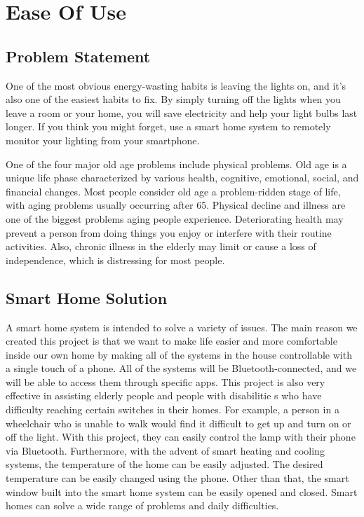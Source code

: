 \section{Ease Of Use}
\subsection{Problem Statement}
One of the most obvious energy-wasting habits is leaving the lights on, and it’s also one of the easiest habits to fix. By simply turning off the lights when you leave a room or your home, you will save electricity and help your light bulbs last longer. If you think you might forget, use a smart home system to remotely monitor your lighting from your smartphone.

One of the four major old age problems include physical problems. Old age is a unique life phase characterized by various health, cognitive, emotional, social, and financial changes. Most people consider old age a problem-ridden stage of life, with aging problems usually occurring after 65. Physical decline and illness are one of the biggest problems aging people experience. Deteriorating health may prevent a person from doing things you enjoy or interfere with their routine activities. Also, chronic illness in the elderly may limit or cause a loss of independence, which is distressing for most people. 

\subsection{Smart Home Solution}
A smart home system is intended to solve a variety of issues. The main reason we created this project is that we want to make life easier and more comfortable inside our own home by making all of the systems in the house controllable with a single touch of a phone. All of the systems will be Bluetooth-connected, and we will be able to access them through specific apps. This project is also very effective in assisting elderly people and people with disabilitie s who have difficulty reaching certain switches in their homes. For example, a person in a wheelchair who is unable to walk would find it difficult to get up and turn on or off the light. With this project, they can easily control the lamp with their phone via Bluetooth. Furthermore, with the advent of smart heating and cooling systems, the temperature of the home can be easily adjusted. The desired temperature can be easily changed using the phone. Other than that, the smart window built into the smart home system can be easily opened and closed. Smart homes can solve a wide range of problems and daily difficulties.

